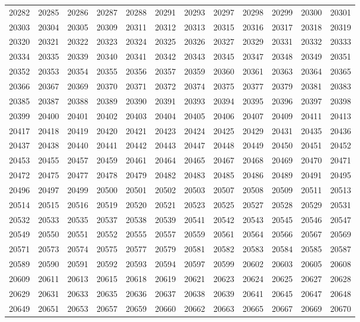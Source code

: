 \begin{center}
\begin{longtable}{llllllllllll}
20282 &20285 &20286 &20287 &20288 &20291 &20293 &20297 &20298 &20299 &20300 &20301 \\
20303 &20304 &20305 &20309 &20311 &20312 &20313 &20315 &20316 &20317 &20318 &20319 \\
20320 &20321 &20322 &20323 &20324 &20325 &20326 &20327 &20329 &20331 &20332 &20333 \\
20334 &20335 &20339 &20340 &20341 &20342 &20343 &20345 &20347 &20348 &20349 &20351 \\
20352 &20353 &20354 &20355 &20356 &20357 &20359 &20360 &20361 &20363 &20364 &20365 \\
20366 &20367 &20369 &20370 &20371 &20372 &20374 &20375 &20377 &20379 &20381 &20383 \\
20385 &20387 &20388 &20389 &20390 &20391 &20393 &20394 &20395 &20396 &20397 &20398 \\
20399 &20400 &20401 &20402 &20403 &20404 &20405 &20406 &20407 &20409 &20411 &20413 \\
20417 &20418 &20419 &20420 &20421 &20423 &20424 &20425 &20429 &20431 &20435 &20436 \\
20437 &20438 &20440 &20441 &20442 &20443 &20447 &20448 &20449 &20450 &20451 &20452 \\
20453 &20455 &20457 &20459 &20461 &20464 &20465 &20467 &20468 &20469 &20470 &20471 \\
20472 &20475 &20477 &20478 &20479 &20482 &20483 &20485 &20486 &20489 &20491 &20495 \\
20496 &20497 &20499 &20500 &20501 &20502 &20503 &20507 &20508 &20509 &20511 &20513 \\
20514 &20515 &20516 &20519 &20520 &20521 &20523 &20525 &20527 &20528 &20529 &20531 \\
20532 &20533 &20535 &20537 &20538 &20539 &20541 &20542 &20543 &20545 &20546 &20547 \\
20549 &20550 &20551 &20552 &20555 &20557 &20559 &20561 &20564 &20566 &20567 &20569 \\
20571 &20573 &20574 &20575 &20577 &20579 &20581 &20582 &20583 &20584 &20585 &20587 \\
20589 &20590 &20591 &20592 &20593 &20594 &20597 &20599 &20602 &20603 &20605 &20608 \\
20609 &20611 &20613 &20615 &20618 &20619 &20621 &20623 &20624 &20625 &20627 &20628 \\
20629 &20631 &20633 &20635 &20636 &20637 &20638 &20639 &20641 &20645 &20647 &20648 \\
20649 &20651 &20653 &20657 &20659 &20660 &20662 &20663 &20665 &20667 &20669 &20670 \\

\end{longtable}
\end{center}
